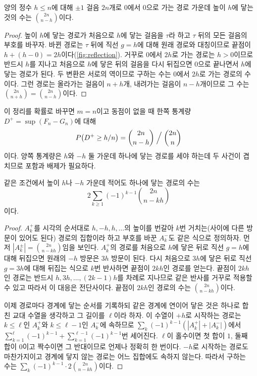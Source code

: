 \begin{theorem}[반사 원리]
\label{thm:reflection-principle}
양의 정수 $h\le n$에 대해 $\pm1$ 걸음 $2n$개로 $0$에서 $0$으로 가는 경로 가운데 높이 $h$에 닿는 것의 수는 $\binom{2n}{n-h}$이다.
\end{theorem}

\begin{proof}
높이 $h$에 닿는 경로가 처음으로 $h$에 닿는 걸음을 $\tau$라 하고 $\tau$ 뒤의 모든 걸음의 부호를 바꾸자. 바뀐 경로는 $\tau$ 뒤에 직선 $g=h$에 대해 원래 경로와 대칭이므로 끝점이 $h+(h-0)=2h$이다(\cref{fig:reflection}). 거꾸로 $0$에서 $2h$로 가는 경로는 $h>0$이므로 반드시 $h$를 지나고 처음으로 $h$에 닿은 뒤의 걸음을 다시 뒤집으면 $0$으로 끝나면서 $h$에 닿는 경로가 된다. 두 변환은 서로의 역이므로 구하는 수는 $0$에서 $2h$로 가는 경로의 수이다. 그런 경로는 올라가는 걸음이 $n+h$개, 내려가는 걸음이 $n-h$개이므로 그 수는 $\binom{2n}{n+h}=\binom{2n}{n-h}$이다.
\end{proof}

이 정리를 확률로 바꾸면 $m=n$이고 동점이 없을 때 한쪽 통계량 $D^+=\sup(F_n-G_n)$에 대해
\[
P\bigl(D^+\ge h/n\bigr)=\binom{2n}{n-h}\Bigm/\binom{2n}n
\]
이다. 양쪽 통계량은 $h$와 $-h$ 둘 가운데 하나에 닿는 경로를 세야 하는데 두 사건이 겹치므로 포함과 배제가 필요하다.

\begin{proposition}
\label{prop:two-sided-reflection}
같은 조건에서 높이 $h$나 $-h$ 가운데 적어도 하나에 닿는 경로의 수는
\[
2\sum_{k\ge1}(-1)^{k-1}\binom{2n}{n-kh}
\]
이다.
\end{proposition}

\begin{proof}
$A_k^+$를 시각의 순서대로 $h,-h,h,\dots$의 높이를 번갈아 $k$번 거치는(사이에 다른 방문이 있어도 된다) 경로의 집합이라 하고 부호를 바꾼 $A_k^-$도 같은 식으로 정의하자. 먼저 $|A_k^\pm|=\binom{2n}{n-kh}$임을 보인다. $A_k^+$의 경로를 처음으로 $h$에 닿은 뒤로 직선 $g=h$에 대해 뒤집으면 원래의 $-h$ 방문은 $3h$ 방문이 된다. 다시 처음으로 $3h$에 닿은 뒤로 직선 $g=3h$에 대해 뒤집는 식으로 $k$번 반사하면 끝점이 $2kh$인 경로를 얻는다. 끝점이 $2kh$인 경로는 반드시 $h,3h,\dots,(2k-1)h$를 차례로 지나므로 같은 반사를 거꾸로 적용할 수 있고 따라서 이 대응은 전단사이다. 끝점이 $2kh$인 경로의 수는 $\binom{2n}{n-kh}$이다.

이제 경로마다 경계에 닿는 순서를 기록하되 같은 경계에 연이어 닿은 것은 하나로 합친 교대 수열을 생각하고 그 길이를 $\ell$이라 하자. 이 수열이 $+h$로 시작하는 경로는 $k\le\ell$인 $A_k^+$와 $k\le\ell-1$인 $A_k^-$에 속하므로 $\sum_k(-1)^{k-1}(|A_k^+|+|A_k^-|)$에서 $\sum_{k=1}^\ell(-1)^{k-1}+\sum_{k=1}^{\ell-1}(-1)^{k-1}$번 세어진다. $\ell$이 홀수이면 첫 합이 $1$, 둘째 합이 $0$이고 짝수이면 그 반대이므로 언제나 정확히 한 번이다. $-h$로 시작하는 경로도 마찬가지이고 경계에 닿지 않는 경로는 어느 집합에도 속하지 않는다. 따라서 구하는 수는 $\sum_k(-1)^{k-1}\cdot2\binom{2n}{n-kh}$이다.
\end{proof}

